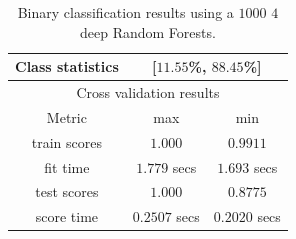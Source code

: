 \documentclass[a4paper, 11pt]{article}
\begin{document}
	\begin{table}[H]
		\caption{\label{tab::binary_rf_1000_4}Binary classification results using a $1000$ $4$ deep Random Forests.}
		\begin{tabular}{|c|c|c|}
			\hline
			Class statistics & \multicolumn{2}{|c|}{[$11.55$\%, $88.45$\%]} \\
			\hline
			\multicolumn{3}{|c|}{Cross validation results}\\
			\hline
			Metric & max & min \\
			 \hline
			train scores & $1.000$ & $0.9911$ \\
			 \hline
			fit time & $1.779$ secs & $1.693$ secs \\
			 \hline
			test scores & $1.000$ & $0.8775$\\
			 \hline
			score time & $0.2507$ secs & $0.2020$ secs\\
			 \hline
		\end{tabular}
	\end{table}
\end{document}
